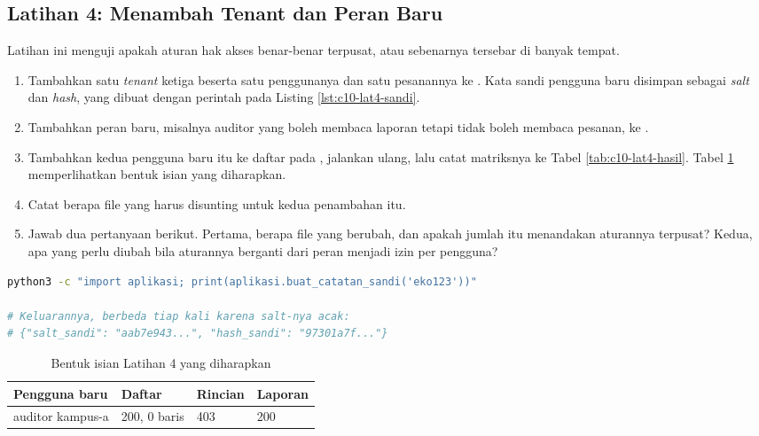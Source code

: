 \subsection*{Latihan 4: Menambah Tenant dan Peran Baru}

Latihan ini menguji apakah aturan hak akses benar-benar terpusat, atau
sebenarnya tersebar di banyak tempat.

\begin{enumerate}
  \item Tambahkan satu \textit{tenant} ketiga beserta satu penggunanya dan
        satu pesanannya ke
        . Kata sandi pengguna baru
        disimpan sebagai \textit{salt} dan \textit{hash}, yang dibuat dengan
        perintah pada Listing \ref{lst:c10-lat4-sandi}.
  \item Tambahkan peran baru, misalnya auditor yang boleh membaca laporan
        tetapi tidak boleh membaca pesanan, ke
        .
  \item Tambahkan kedua pengguna baru itu ke daftar pada
        , jalankan ulang, lalu
        catat matriksnya ke Tabel \ref{tab:c10-lat4-hasil}. Tabel
        \ref{tab:c10-lat4-contoh} memperlihatkan bentuk isian yang
        diharapkan.
  \item Catat berapa file yang harus disunting untuk kedua penambahan itu.
  \item Jawab dua pertanyaan berikut. Pertama, berapa file yang berubah, dan
        apakah jumlah itu menandakan aturannya terpusat? Kedua, apa yang
        perlu diubah bila aturannya berganti dari peran menjadi izin per
        pengguna?
\end{enumerate}

\begin{lstlisting}[language=bash, caption={Membuat \textit{salt} dan \textit{hash} kata sandi pengguna baru, tersedia di \berkas{sources/chapter10/aplikasi.py}}, label={lst:c10-lat4-sandi}]
python3 -c "import aplikasi; print(aplikasi.buat_catatan_sandi('eko123'))"

# Keluarannya, berbeda tiap kali karena salt-nya acak:
# {"salt_sandi": "aab7e943...", "hash_sandi": "97301a7f..."}
\end{lstlisting}

\begin{table}[!htb]
  \centering
  \caption{Bentuk isian Latihan 4 yang diharapkan}
  \label{tab:c10-lat4-contoh}
  \begin{tabularx}{\textwidth}{Xlll}
    \hline
    \textbf{Pengguna baru} & \textbf{Daftar} & \textbf{Rincian} & \textbf{Laporan} \\
    \hline
    auditor kampus-a & 200, 0 baris & 403 & 200 \\
    \hline
  \end{tabularx}
\end{table}

